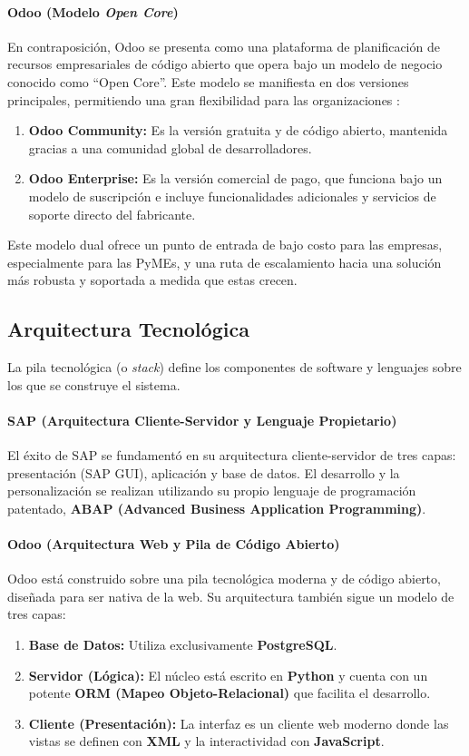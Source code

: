\documentclass[12pt,letterpaper,spanish]{report}
\begin{document}
\paragraph{Odoo (Modelo \textit{Open Core})}
En contraposición, Odoo se presenta como una plataforma de planificación de recursos empresariales de código abierto \cite{pretell2024mejora} que opera bajo un modelo de negocio conocido como ``Open Core''. Este modelo se manifiesta en dos versiones principales, permitiendo una gran flexibilidad para las organizaciones \cite{TortCarrillo2024}:
\begin{enumerate}
    \item \textbf{Odoo Community:} Es la versión gratuita y de código abierto, mantenida gracias a una comunidad global de desarrolladores.
    \item \textbf{Odoo Enterprise:} Es la versión comercial de pago, que funciona bajo un modelo de suscripción e incluye funcionalidades adicionales y servicios de soporte directo del fabricante.
\end{enumerate}
Este modelo dual ofrece un punto de entrada de bajo costo para las empresas, especialmente para las PyMEs, y una ruta de escalamiento hacia una solución más robusta y soportada a medida que estas crecen.

\subsection{Arquitectura Tecnológica}

La pila tecnológica (o \textit{stack}) define los componentes de software y lenguajes sobre los que se construye el sistema.

\paragraph{SAP (Arquitectura Cliente-Servidor y Lenguaje Propietario)}
El éxito de SAP se fundamentó en su arquitectura cliente-servidor de tres capas: presentación (SAP GUI), aplicación y base de datos. El desarrollo y la personalización se realizan utilizando su propio lenguaje de programación patentado, \textbf{ABAP (Advanced Business Application Programming)}.

\paragraph{Odoo (Arquitectura Web y Pila de Código Abierto)}
Odoo está construido sobre una pila tecnológica moderna y de código abierto, diseñada para ser nativa de la web. Su arquitectura también sigue un modelo de tres capas:
\begin{enumerate}
    \item \textbf{Base de Datos:} Utiliza exclusivamente \textbf{PostgreSQL}.
    \item \textbf{Servidor (Lógica):} El núcleo está escrito en \textbf{Python} y cuenta con un potente \textbf{ORM (Mapeo Objeto-Relacional)} que facilita el desarrollo.
    \item \textbf{Cliente (Presentación):} La interfaz es un cliente web moderno donde las vistas se definen con \textbf{XML} y la interactividad con \textbf{JavaScript}.
\end{enumerate}
\end{document}
